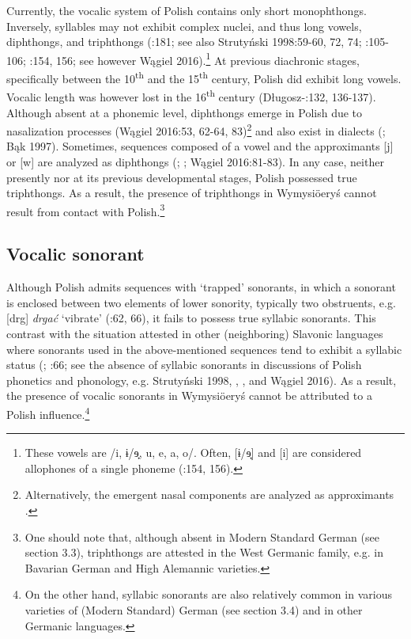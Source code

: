 \documentclass[output=paper]{langscibook}
\begin{document}
Currently, the vocalic system of Polish contains only short monophthongs. Inversely, syllables may not exhibit complex nuclei, and thus long vowels, diphthongs, and triphthongs (\citealt{Gussmann2007}:181; see also Strutyński 1998:59-60, 72, 74; \citealt{Jassem2003}:105-106; \citealt{SussexCubberley2006}:154, 156; see however Wągiel 2016).\footnote{These vowels are /i, ɨ/ɘ̟, u, e, a, o/. Often, [ɨ/ɘ̟] and [i] are considered allophones of a single phoneme (\citealt{SussexCubberley2006}:154, 156).} At previous diachronic stages, specifically between the 10\textsuperscript{th} and the 15\textsuperscript{th} century, Polish did exhibit long vowels. Vocalic length was however lost in the 16\textsuperscript{th} century (Długosz-\citealt{KurczabowaDubisz2006}:132, 136-137). Although absent at a phonemic level, diphthongs emerge in Polish due to nasalization processes (Wągiel 2016:53, 62-64, 83)\footnote{Alternatively, the emergent nasal components are analyzed as approximants \citep{Gussmann2007}.} and also exist in dialects (\citealt{Dejna1973}; Bąk 1997). Sometimes, sequences composed of a vowel and the approximants [j] or [w] are analyzed as diphthongs (\citealt{Jassem1973}; \citealt{Demenko1999}; Wągiel 2016:81-83). In any case, neither presently nor at its previous developmental stages, Polish possessed true triphthongs. As a result, the presence of triphthongs in Wymysiöeryś cannot result from contact with Polish.\footnote{One should note that, although absent in Modern Standard German (see section 3.3), triphthongs are attested in the West Germanic family, e.g. in Bavarian German and High Alemannic varieties.}

\subsection{Vocalic sonorant}\label{sec:wymsorys:4.2}


Although Polish admits sequences with ‘trapped’ sonorants, in which a sonorant is enclosed between two elements of lower sonority, typically two obstruents, e.g. [drg] \textit{drgać} ‘vibrate’ (\citealt{Kijak2008}:62, 66), it fails to possess true syllabic sonorants. This contrast with the situation attested in other (neighboring) Slavonic languages where sonorants used in the above-mentioned sequences tend to exhibit a syllabic status (\citealt{SussexCubberley2006}; \citealt{Kijak2008}:66; see the absence of syllabic sonorants in discussions of Polish phonetics and phonology, e.g. Strutyński 1998, \citealt{Jassem2003}, \citealt{Gussmann2007}, and Wągiel 2016). As a result, the presence of vocalic sonorants in Wymysiöeryś cannot be attributed to a Polish influence.\footnote{On the other hand, syllabic sonorants are also relatively common in various varieties of (Modern Standard) German (see section 3.4) and in other Germanic languages.}
\end{document}
